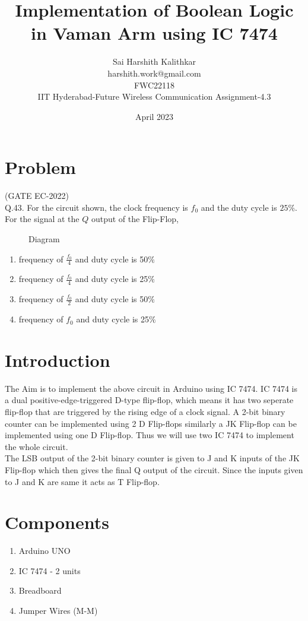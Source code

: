 \documentclass{article}
\title{Implementation of Boolean Logic in Vaman Arm using IC 7474}
\date{April 2023}
\author{Sai Harshith Kalithkar\\harshith.work@gmail.com\\FWC22118\\IIT Hyderabad-Future Wireless Communication Assignment-4.3}
\begin{document}
\maketitle
	\tableofcontents
\pagebreak
\section{Problem}
	(GATE EC-2022)\\
	Q.43. For the circuit shown, the clock frequency is $f_0$ and the duty cycle is $25 \%$. For the signal at the $Q$ output of the Flip-Flop,
\\
\begin{figure}[h]

	\caption{Diagram}
	\label{fig:1}
\end{figure}

\begin{enumerate}
	\item frequency of $\frac{f_0}{4}$ and duty cycle is 50$\%$
	\item frequency of $\frac{f_0}{4}$ and duty cycle is 25$\%$
	\item frequency of $\frac{f_0}{2}$ and duty cycle is 50$\%$
	\item frequency of $f_0$ and duty cycle is 25$\%$ \\
\end{enumerate}

\section{Introduction}
		The Aim is to implement the above circuit in Arduino using IC 7474. IC 7474 is a dual positive-edge-triggered D-type flip-flop, which means it has two seperate flip-flop that are triggered by the rising edge of a clock signal. A 2-bit binary counter can be implemented using 2 D Flip-flops similarly a JK Flip-flop can be implemented using one D Flip-flop. Thus we will use two IC 7474 to implement the whole circuit.\\

		The LSB output of the 2-bit binary counter is given to J and K inputs of the JK Flip-flop which then gives the final Q output of the circuit. Since the inputs given to J and K are same it acts as T Flip-flop.\\
\section{Components}
	\begin{enumerate}
		\item Arduino UNO
		\item IC 7474 - 2 units
		\item Breadboard
		\item Jumper Wires (M-M) \\
	\end{enumerate}
\end{document}
